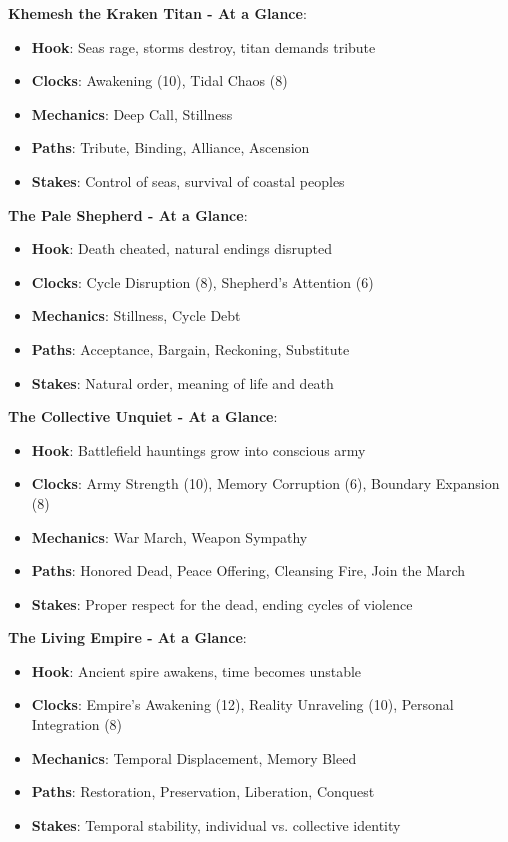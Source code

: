 \documentclass[11pt]{article}
\begin{document}
\begin{mdframed}[backgroundcolor=epicbg]
\textbf{Khemesh the Kraken Titan - At a Glance}:
\begin{itemize}[leftmargin=*]
\item \textbf{Hook}: Seas rage, storms destroy, titan demands tribute
\item \textbf{Clocks}: Awakening (10), Tidal Chaos (8)
\item \textbf{Mechanics}: Deep Call, Stillness
\item \textbf{Paths}: Tribute, Binding, Alliance, Ascension
\item \textbf{Stakes}: Control of seas, survival of coastal peoples
\end{itemize}

\textbf{The Pale Shepherd - At a Glance}:
\begin{itemize}[leftmargin=*]
\item \textbf{Hook}: Death cheated, natural endings disrupted
\item \textbf{Clocks}: Cycle Disruption (8), Shepherd's Attention (6)
\item \textbf{Mechanics}: Stillness, Cycle Debt
\item \textbf{Paths}: Acceptance, Bargain, Reckoning, Substitute
\item \textbf{Stakes}: Natural order, meaning of life and death
\end{itemize}

\textbf{The Collective Unquiet - At a Glance}:
\begin{itemize}[leftmargin=*]
\item \textbf{Hook}: Battlefield hauntings grow into conscious army
\item \textbf{Clocks}: Army Strength (10), Memory Corruption (6), Boundary Expansion (8)
\item \textbf{Mechanics}: War March, Weapon Sympathy
\item \textbf{Paths}: Honored Dead, Peace Offering, Cleansing Fire, Join the March
\item \textbf{Stakes}: Proper respect for the dead, ending cycles of violence
\end{itemize}

\textbf{The Living Empire - At a Glance}:
\begin{itemize}[leftmargin=*]
\item \textbf{Hook}: Ancient spire awakens, time becomes unstable
\item \textbf{Clocks}: Empire's Awakening (12), Reality Unraveling (10), Personal Integration (8)
\item \textbf{Mechanics}: Temporal Displacement, Memory Bleed
\item \textbf{Paths}: Restoration, Preservation, Liberation, Conquest
\item \textbf{Stakes}: Temporal stability, individual vs. collective identity
\end{itemize}
\end{mdframed}
\end{document}
